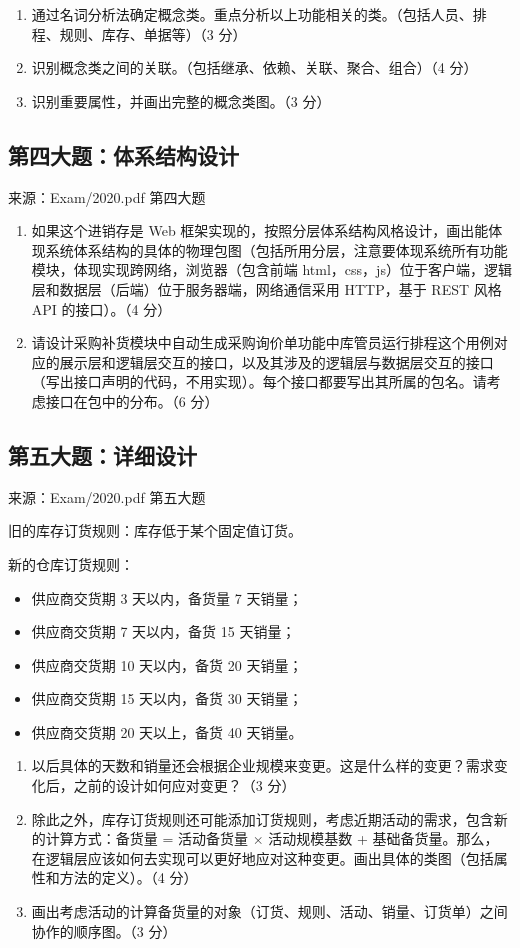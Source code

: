 \documentclass[UTF8,zihao=-4]{ctexart}
\newcommand{\qtitle}[2]{%
  \subsection*{#1}
  {\small\color{TextGray}来源：#2}\par
}
\begin{document}
\begin{enumerate}
  \item 通过名词分析法确定概念类。重点分析以上功能相关的类。（包括人员、排程、规则、库存、单据等）（3 分）
  \item 识别概念类之间的关联。（包括继承、依赖、关联、聚合、组合）（4 分）
  \item 识别重要属性，并画出完整的概念类图。（3 分）
\end{enumerate}

\qtitle{第四大题：体系结构设计}{Exam/2020.pdf 第四大题}
\begin{enumerate}
  \item 如果这个进销存是 Web 框架实现的，按照分层体系结构风格设计，画出能体现系统体系结构的具体的物理包图（包括所用分层，注意要体现系统所有功能模块，体现实现跨网络，浏览器（包含前端 html，css，js）位于客户端，逻辑层和数据层（后端）位于服务器端，网络通信采用 HTTP，基于 REST 风格 API 的接口）。（4 分）
  \item 请设计采购补货模块中自动生成采购询价单功能中库管员运行排程这个用例对应的展示层和逻辑层交互的接口，以及其涉及的逻辑层与数据层交互的接口（写出接口声明的代码，不用实现）。每个接口都要写出其所属的包名。请考虑接口在包中的分布。（6 分）
\end{enumerate}

\qtitle{第五大题：详细设计}{Exam/2020.pdf 第五大题}
旧的库存订货规则：库存低于某个固定值订货。

新的仓库订货规则：
\begin{itemize}
  \item 供应商交货期 3 天以内，备货量 7 天销量；
  \item 供应商交货期 7 天以内，备货 15 天销量；
  \item 供应商交货期 10 天以内，备货 20 天销量；
  \item 供应商交货期 15 天以内，备货 30 天销量；
  \item 供应商交货期 20 天以上，备货 40 天销量。
\end{itemize}

\begin{enumerate}
  \item 以后具体的天数和销量还会根据企业规模来变更。这是什么样的变更？需求变化后，之前的设计如何应对变更？（3 分）
  \item 除此之外，库存订货规则还可能添加订货规则，考虑近期活动的需求，包含新的计算方式：备货量 = 活动备货量 $\times$ 活动规模基数 + 基础备货量。那么，在逻辑层应该如何去实现可以更好地应对这种变更。画出具体的类图（包括属性和方法的定义）。（4 分）
  \item 画出考虑活动的计算备货量的对象（订货、规则、活动、销量、订货单）之间协作的顺序图。（3 分）
\end{enumerate}
\end{document}
